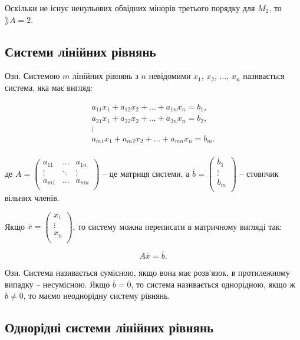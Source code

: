 Оскільки не існує ненульових обвідних мінорів третього порядку для $M_2$, то
$\rang A = 2$.

\subsection{Системи лінійних рівнянь}

Озн. Системою $m$ лінійних рівнянь з $n$ невідомими $x_1$, $x_2$, ..., $x_n$ називається
система, яка має вигляд:

$$\begin{array}{l}
	a_{11} x_1 + a_{12} x_2 + ... + a_{1n} x_n = b_1, \\
	a_{21} x_1 + a_{22} x_2 + ... + a_{2n} x_n = b_2, \\
	\vdots \\
	a_{m1} x_1 + a_{m2} x_2 + ... + a_{mn} x_n = b_m. \\
\end{array}$$

де $A = \begin{pmatrix}
	a_{11} & ...    & a_{1n} \\
	\vdots & \ddots & \vdots \\
	a_{m1} & ...    & a_{mn} \\
\end{pmatrix}$ -- це матриця системи, а $\overline{b} = \begin{pmatrix}
	b_1 \\
	\vdots \\	
	b_m \\
\end{pmatrix}$ -- стовпчик вільних членів.


Якщо $\overline{x} = \begin{pmatrix}
	x_1 \\
	\vdots \\	
	x_n \\
\end{pmatrix}$, то систему можна переписати в матричному вигляді так:

$$ A \overline{x} =  \overline{b}.$$


Озн. Система називається сумісною, якщо вона має розв’язок, в
протилежному випадку -- несумісною. Якщо $\overline{b} = \overline{0}$, то система називається
однорідною, якщо ж $\overline{b} \neq \overline{0}$, то маємо неоднорідну систему рівнянь.

\subsection{Однорідні системи лінійних рівнянь}

